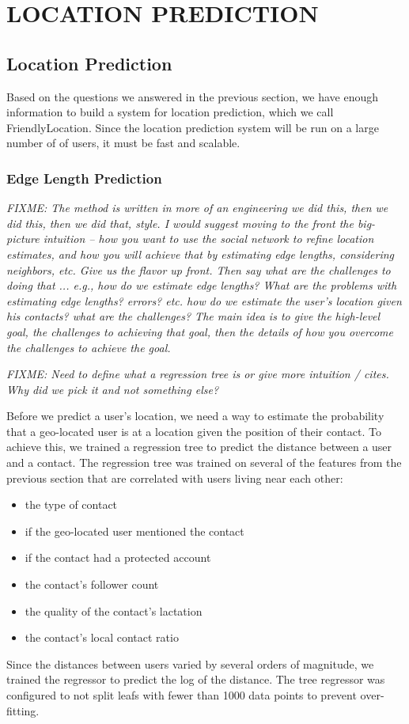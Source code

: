 \ifdefined\THESIS
    \chapter{\uppercase{Location Prediction}}
\else
    \section{Location Prediction}
\fi

Based on the questions we answered in the previous section, we have enough
information to build a system for location prediction, which we call
FriendlyLocation.
Since the location prediction system will be run on a large number of of users,
it must be fast and scalable.

\subsection{Edge Length Prediction}

\emph{
  FIXME: The method is written in more of an engineering we did this, then we
  did this, then we did that, style. I would suggest moving to the front the
  big-picture intuition -- how you want to use the social network to refine
  location estimates, and how you will achieve that by estimating edge lengths,
  considering neighbors, etc. Give us the flavor up front. Then say what are
  the challenges to doing that ... e.g., how do we estimate edge lengths? What
  are the problems with estimating edge lengths? errors? etc. how do we
  estimate the user's location given his contacts? what are the challenges?
  The main idea is to give the high-level goal, the challenges to achieving
  that goal, then the details of how you overcome the challenges to achieve the
  goal.
}

\emph{
  FIXME: Need to define what a regression tree is or give more intuition /
  cites. Why did we pick it and not something else?
}

Before we predict a user's location, we need a way to estimate the probability
that a geo-located user is at a location given the position of their contact.
%
To achieve this, we trained a regression tree to predict the distance between a
user and a contact.
%
The regression tree was trained on several of the features from the previous
section that are correlated with users living near each other:
\begin{itemize}
\item the type of contact
\item if the geo-located user mentioned the contact
\item if the contact had a protected account
\item the contact's follower count
\item the quality of the contact's lactation
\item the contact's local contact ratio
\end{itemize}
%
Since the distances between users varied by several orders of magnitude, we
trained the regressor to predict the log of the distance.
%
The tree regressor was configured to not split leafs with fewer than 1000 data
points to prevent over-fitting.

